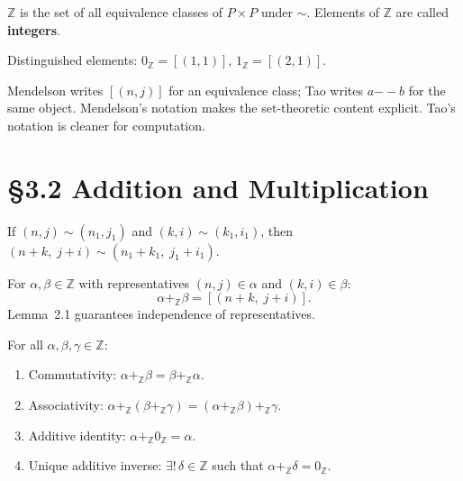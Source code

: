 \begin{tcolorbox}[colback=corbox, colframe=corborder, arc=2pt,
  left=6pt, right=6pt, top=4pt, bottom=4pt,
  title={\small\textbf{Definition 3.2 (The integers $\mathbb{Z}$)}},
  fonttitle=\small\bfseries]
$\mathbb{Z}$ is the set of all equivalence classes of $P \times P$
under $\sim$.  Elements of $\mathbb{Z}$ are called \textbf{integers}.

Distinguished elements:
$0_{\mathbb{Z}} = [(1,1)]$, \quad $1_{\mathbb{Z}} = [(2,1)]$.
\end{tcolorbox}

\begin{remark}
Mendelson writes $[(n,j)]$ for an equivalence class;
Tao writes $a {-\!\!-} b$ for the same object.
Mendelson's notation makes the set-theoretic content explicit.
Tao's notation is cleaner for computation.
\end{remark}

\section*{§3.2 \quad Addition and Multiplication}

\begin{lemma}
\label{lem:men-add-welld}
If $(n,j) \sim (n_1,j_1)$ and $(k,i) \sim (k_1,i_1)$, then
$(n+k,\; j+i) \sim (n_1+k_1,\; j_1+i_1)$.
\end{lemma}

\begin{tcolorbox}[colback=corbox, colframe=corborder, arc=2pt,
  left=6pt, right=6pt, top=4pt, bottom=4pt,
  title={\small\textbf{Definition 3.3 (Addition)}},
  fonttitle=\small\bfseries]
For $\alpha, \beta \in \mathbb{Z}$ with representatives
$(n,j) \in \alpha$ and $(k,i) \in \beta$:
\[
\alpha +_{\mathbb{Z}} \beta = [(n+k,\; j+i)].
\]
Lemma~2.1 guarantees independence of representatives.
\end{tcolorbox}

\begin{theorem}
\label{thm:men-add}
For all $\alpha, \beta, \gamma \in \mathbb{Z}$:
\begin{enumerate}
  \item[(i)] Commutativity: $\alpha +_{\mathbb{Z}} \beta
    = \beta +_{\mathbb{Z}} \alpha$.
  \item[(ii)] Associativity: $\alpha +_{\mathbb{Z}}
    (\beta +_{\mathbb{Z}} \gamma)
    = (\alpha +_{\mathbb{Z}} \beta) +_{\mathbb{Z}} \gamma$.
  \item[(iii)] Additive identity: $\alpha +_{\mathbb{Z}} 0_{\mathbb{Z}}
    = \alpha$.
  \item[(iv)] Unique additive inverse: $\exists!\,\delta \in \mathbb{Z}$
    such that $\alpha +_{\mathbb{Z}} \delta = 0_{\mathbb{Z}}$.
\end{enumerate}
\end{theorem}

